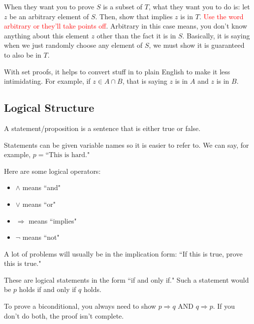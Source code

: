 \documentclass[11pt]{scrartcl}
\begin{document}
\begin{advice}
    When they want you to prove $S$ is a subset of $T$, what they want you to do is: let $z$ be an arbitrary element of $S$. Then, show that implies $z$ is in $T$. \textcolor{red}{Use the word arbitrary or they'll take points off}. Arbitrary in this case means, you don't know anything about this element $z$ other than the fact it is in $S$. Basically, it is saying when we just randomly choose any element of $S$, we must show it is guaranteed to also be in $T$.
\end{advice}

\begin{advice}
    With set proofs, it helps to convert stuff in to plain English to make it less intimidating. For example, if $z \in A \cap B$, that is saying $z$ is in $A$ and $z$ is in $B$.
\end{advice}

\subsection{Logical Structure}

\begin{definition}
    A statement/proposition is a sentence that is either true or false.
\end{definition}
Statements can be given variable names so it is easier to refer to. We can say, for example, $p = \text{``This is hard."}$

Here are some logical operators:
\begin{itemize}
    \item $\wedge$ means ``and"
    \item $\vee$ means ``or"
    \item $\Rightarrow$ means ``implies"
    \item $\neg$ means ``not"
\end{itemize}

A lot of problems will usually be in the implication form: ``If this is true, prove this is true."

\begin{definition}[Biconditional]
    These are logical statements in the form ``if and only if." Such a statement would be $p$ holds if and only if $q$ holds.
\end{definition}
To prove a biconditional, you always need to show $p \Rightarrow q$ AND $q \Rightarrow p$. If you don't do both, the proof isn't complete.
\end{document}
